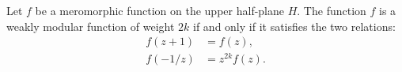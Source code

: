 Let $f$ be a meromorphic function on the upper half-plane $H$. The function $f$ is a weakly modular function of weight $2k$ if and only if it satisfies the two relations:
\begin{align}
f(z+1) &= f(z), \\
f(-1/z) &= z^{2k} f(z).
\end{align}
